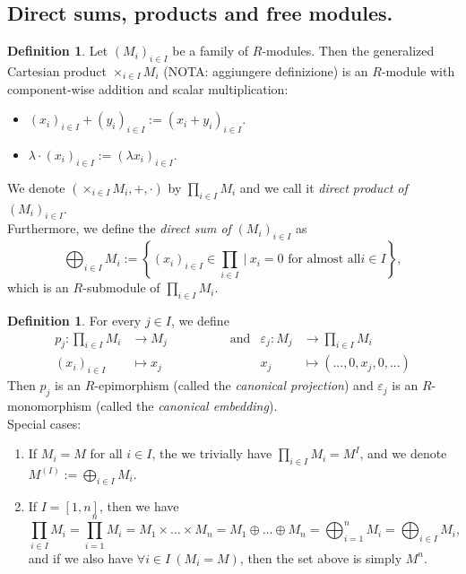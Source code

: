 \documentclass[12pt,a4paper]{report}
\theoremstyle{definition}
\newtheorem{defn}[theorem]{Definition}
\theoremstyle{num.custom-title}
\renewcommand{\epsilon}{\varepsilon}
\begin{document}
\subsection{Direct sums, products and free modules.}

\begin{defn}
Let $(M_i)_{i \in I}$ be a family of $R$-modules. Then the generalized Cartesian product $\times_{i \in I} M_i$ (NOTA: aggiungere definizione) is an $R$-module with component-wise addition and scalar multiplication:
\begin{itemize}
\item $(x_i)_{i \in I} + (y_i)_{i \in I} := (x_i+y_i)_{i \in I}$.
\item $\lambda \cdot (x_i)_{i \in I} := (\lambda x_i)_{i \in I}$.
\end{itemize}
We denote $(\times_{i \in I} M_i, +, \cdot)$ by $\prod_{i \in I} M_i$ and we call it \emph{direct product of} $(M_i)_{i \in I}$.\\
Furthermore, we define the \emph{direct sum of} $(M_i)_{i \in I}$ as
\[
\bigoplus_{i \in I} M_i := \left\{ (x_i)_{i \in I} \in \prod_{i \in I} \ \Bigg| \ x_i = 0 \text{ for almost all} i \in I \right\},
\]
which is an $R$-submodule of $\prod_{i \in I} M_i$.
\end{defn}

\begin{defn}
For every $j \in I$, we define 
\begin{align*}
p_j \colon \prod_{i \in I} M_i &\to M_j  \quad \quad \quad \quad \quad \text{and}  &\epsilon_j \colon M_j &\to \prod_{i \in I} M_i \\
(x_i)_{i \in I} &\mapsto x_j    &x_j &\mapsto (...,0,x_j,0,...)
\end{align*}
Then $p_j$ is an $R$-epimorphism (called the \emph{canonical projection}) and $\epsilon_j$ is an $R$-monomorphism (called the \emph{canonical embedding}).\\
Special cases:
\begin{enumerate}
\item If $M_i = M$ for all $i \in I$, the we trivially have $\prod_{i \in I} M_i = M^I$, and we denote $M^{(I)} := \bigoplus_{i \in I} M_i$.
\item If $I=[1,n]$, then we have
\[
\prod_{i \in I} M_i = \prod_{i=1}^n M_i = M_1 \times \ldots \times M_n = M_1 \oplus \ldots \oplus M_n = \bigoplus_{i=1}^n M_i = \bigoplus_{i \in I} M_i,
\]
and if we also have $\forall i \in I \ (M_i=M)$, then the set above is simply $M^n$.
\end{enumerate}
\end{defn}
\end{document}
